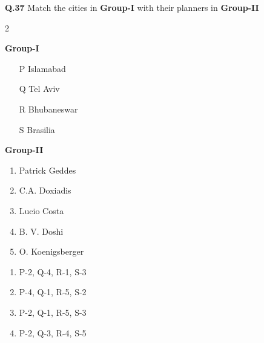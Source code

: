 \documentclass{article}
\begin{document}
\noindent\textbf{Q.37} Match the cities in \textbf{Group-I} with their planners in \textbf{Group-II}
\begin{multicols} {2}
    
\hspace{1cm} \textbf{Group-I}
\begin{enumerate}[label= (\Alph*) ,leftmargin=1.5cm]
    \item [P] \hspace{0.2cm} Islamabad
    \item [Q] \hspace{0.2cm} Tel Aviv
    \item [R] \hspace{0.2cm} Bhubaneswar
    \item [S] \hspace{0.2cm} Brasilia
\end{enumerate}
\columnbreak
\noindent \hspace{1cm} \textbf{Group-II}
\begin{enumerate}
    \item Patrick Geddes
    \item C.A. Doxiadis
    \item Lucio Costa
    \item B. V. Doshi
    \item O. Koenigsberger
\end{enumerate}
\end{multicols}
\begin{multicols}{2}
\begin{enumerate}[label=(\Alph*),leftmargin=1.5cm]
    \item P-2, Q-4, R-1, S-3
    \item P-4, Q-1, R-5, S-2
    \item P-2, Q-1, R-5, S-3
    \item P-2, Q-3, R-4, S-5
\end{enumerate}
\end{multicols}

\vspace{0.1cm}
\end{document}
